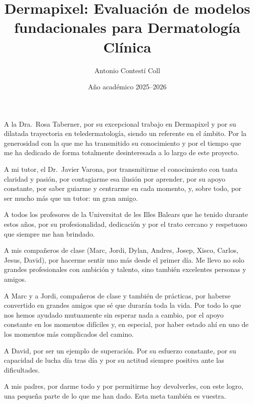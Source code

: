 \documentclass[spanish, GINF, openany]{TFGEPSUIB}
\title{Dermapixel: Evaluación de modelos fundacionales para Dermatología Clínica}
\author{Antonio Contestí Coll}
\date{Año académico 2025--2026}
\begin{document}
\portada
\portadainterior
\frontmatter

\cleartorecto \thispagestyle{empty}
\vspace*{-3cm}
\begin{agraiments}

A la Dra.~Rosa Taberner, por su excepcional trabajo en Dermapixel y por su dilatada trayectoria en teledermatología, siendo un referente en el ámbito. Por la generosidad con la que me ha transmitido su conocimiento y por el tiempo que me ha dedicado de forma totalmente desinteresada a lo largo de este proyecto.

\medskip

A mi tutor, el Dr.\ Javier Varona, por transmitirme el conocimiento con tanta claridad y pasión, por contagiarme esa ilusión por aprender, por su apoyo constante, por saber guiarme y centrarme en cada momento, y, sobre todo, por ser mucho más que un tutor: un gran amigo.

\medskip

A todos los profesores de la Universitat de les Illes Balears que he tenido durante estos años, por su profesionalidad, dedicación y por el trato cercano y respetuoso que siempre me han brindado.

\medskip

A mis compañeros de clase (Marc, Jordi, Dylan, Andres, Josep, Xisco, Carlos, Jesus, David), por hacerme sentir uno más desde el primer día. Me llevo no solo grandes profesionales con ambición y talento, sino también excelentes personas y amigos.

\medskip

A Marc y a Jordi, compañeros de clase y también de prácticas, por haberse convertido en grandes amigos que sé que durarán toda la vida. Por todo lo que nos hemos ayudado mutuamente sin esperar nada a cambio, por el apoyo constante en los momentos difíciles y, en especial, por haber estado ahí en uno de los momentos más complicados del camino.

\medskip

A David, por ser un ejemplo de superación. Por su esfuerzo constante, por su capacidad de lucha día tras día y por su actitud siempre positiva ante las dificultades.

\medskip

A mis padres, por darme todo y por permitirme hoy devolverles, con este logro, una pequeña parte de lo que me han dado. Esta meta también es vuestra.

\medskip


\end{agraiments}
\end{document}
